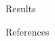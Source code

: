 \documentclass[serif,mathserif,final,table]{beamer}
\begin{document}
\begin{frame}{}
\begin{columns}[t]
\begin{column}{0.235\linewidth}
\begin{block}{Results}
	\end{block}
		\begin{block}{References}
			{\tiny  }
		\end{block}
	

\end{column}
  \end{columns}
\end{frame}
\end{document}

